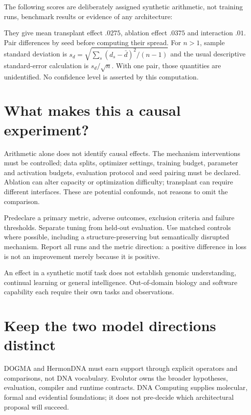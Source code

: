 The following scores are deliberately assigned synthetic arithmetic, not
training runs, benchmark results or evidence of any architecture:
\begin{center}\end{center}
They give mean transplant effect $.0275$, ablation effect $.0375$ and
interaction $.01$. Pair differences by seed before computing their spread.
For $n>1$, sample standard deviation is
$s_d=\sqrt{\sum_s(d_s-\bar d)^2/(n-1)}$ and the usual descriptive standard-error
calculation is $s_d/\sqrt n$. With one pair, those quantities are unidentified.
No confidence level is asserted by this computation.

\section{What makes this a causal experiment?}
Arithmetic alone does not identify causal effects. The mechanism interventions
must be controlled; data splits, optimizer settings, training budget, parameter
and activation budgets, evaluation protocol and seed pairing must be declared.
Ablation can alter capacity or optimization difficulty; transplant can require
different interfaces. These are potential confounds, not reasons to omit the
comparison.

Predeclare a primary metric, adverse outcomes, exclusion criteria and failure
thresholds. Separate tuning from held-out evaluation. Use matched controls
where possible, including a structure-preserving but semantically disrupted
mechanism. Report all runs and the metric direction: a positive difference in
loss is not an improvement merely because it is positive.

An effect in a synthetic motif task does not establish genomic understanding,
continual learning or general intelligence. Out-of-domain biology and software
capability each require their own tasks and observations.

\section{Keep the two model directions distinct}
DOGMA and HermonDNA must earn support through explicit operators and comparisons,
not DNA vocabulary. Evolutor owns the broader hypotheses, evaluation, compiler
and runtime contracts. DNA Computing supplies molecular, formal and evidential
foundations; it does not pre-decide which architectural proposal will succeed.

